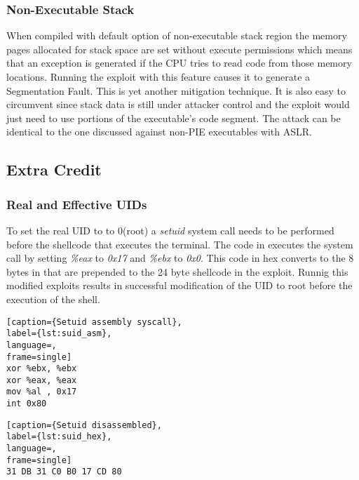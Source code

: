 \subsubsection { Non-Executable Stack }
When compiled with default option of non-executable stack region the memory pages allocated for stack space are set without execute permissions which means that an exception is generated if the CPU tries to read code from those memory locations. Running the exploit with this feature causes it to generate a Segmentation Fault. This is yet another mitigation technique. It is also easy to circumvent since stack data is still under attacker control and the exploit would just need to use portions of the executable's code segment. The attack can be identical to the one discussed against non-PIE executables with ASLR. \\
\subsection {Extra Credit}
\subsubsection{ Real and Effective UIDs }
To set the real UID to to 0(root) a \emph{setuid} system call needs to be performed before the shellcode that executes the terminal. The code in  executes the system call by setting \emph{\%eax} to \emph{0x17} and \emph{\%ebx} to \emph{0x0}. This code in hex converts to the 8 bytes in  that are prepended to the 24 byte shellcode in the exploit. Runnig this modified exploits results in successful modification of the UID to root before the execution of the shell.

\begin{minipage}{\linewidth}
\begin{lstlisting}[caption={Setuid assembly syscall},
label={lst:suid_asm},
language=,
frame=single]
xor %ebx, %ebx
xor %eax, %eax
mov %al , 0x17
int 0x80
\end{lstlisting}
\end{minipage}

\begin{minipage}{\linewidth}
\begin{lstlisting}[caption={Setuid disassembled},
label={lst:suid_hex},
language=,
frame=single]
31 DB 31 C0 B0 17 CD 80
\end{lstlisting}
\end{minipage}

